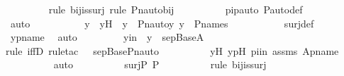 \begin{isabellebody}
\ \ \ \ \ \ \ \ \isamarkupfalse%
{\isacharparenleft}{\kern0pt}rule\ bij{\isacharunderscore}{\kern0pt}is{\isacharunderscore}{\kern0pt}surj{\isacharcomma}{\kern0pt}\ rule\ Pn{\isacharunderscore}{\kern0pt}auto{\isacharunderscore}{\kern0pt}bij{\isacharparenright}{\kern0pt}\isanewline
\ \ \ \ \ \ \ \ \isamarkupfalse%
\ pipauto\ P{\isacharunderscore}{\kern0pt}auto{\isacharunderscore}{\kern0pt}def\isanewline
\ \ \ \ \ \ \ \ \isamarkupfalse%
\ auto\ \isanewline
\ \ \ \ \ \ \isamarkupfalse%
\ \isamarkupfalse%
\ y{\isacharprime}{\kern0pt}\ \ y{\isacharprime}{\kern0pt}H\ {\isacharcolon}{\kern0pt}\ {\isachardoublequoteopen}y\ {\isacharequal}{\kern0pt}\ Pn{\isacharunderscore}{\kern0pt}auto{\isacharparenleft}{\kern0pt}{\isasympi}{\isacharparenright}{\kern0pt}{\isacharbackquote}{\kern0pt}y{\isacharprime}{\kern0pt}{\isachardoublequoteclose}\ {\isachardoublequoteopen}y{\isacharprime}{\kern0pt}\ {\isasymin}\ P{\isacharunderscore}{\kern0pt}names{\isachardoublequoteclose}\ \isanewline
\ \ \ \ \ \ \ \ \isamarkupfalse%
\ surj{\isacharunderscore}{\kern0pt}def\ \isamarkupfalse%
\ ypname\ \isamarkupfalse%
\ auto\ \isanewline
\ \ \ \ \ \ \isamarkupfalse%
\ y{\isacharprime}{\kern0pt}in\ {\isacharcolon}{\kern0pt}\ {\isachardoublequoteopen}y{\isacharprime}{\kern0pt}\ {\isasymin}\ sep{\isacharunderscore}{\kern0pt}Base{\isacharparenleft}{\kern0pt}A{\isacharparenright}{\kern0pt}{\isachardoublequoteclose}\ \isanewline
\ \ \ \ \ \ \ \ \isamarkupfalse%
{\isacharparenleft}{\kern0pt}rule\ iffD{}{\isacharcomma}{\kern0pt}\ rule{\isacharunderscore}{\kern0pt}tac\ {\isasympi}{\isacharequal}{\kern0pt}{\isasympi}\ \ sep{\isacharunderscore}{\kern0pt}Base{\isacharunderscore}{\kern0pt}Pn{\isacharunderscore}{\kern0pt}auto{\isacharparenright}{\kern0pt}\isanewline
\ \ \ \ \ \ \ \ \isamarkupfalse%
\ y{\isacharprime}{\kern0pt}H\ ypH\ piin\ assms\ Apname\isanewline
\ \ \ \ \ \ \ \ \isamarkupfalse%
\ auto\isanewline
\isanewline
\ \ \ \ \ \ \isamarkupfalse%
\ {\isachardoublequoteopen}{\isasympi}\ {\isasymin}\ surj{\isacharparenleft}{\kern0pt}P{\isacharcomma}{\kern0pt}\ P{\isacharparenright}{\kern0pt}{\isachardoublequoteclose}\ \isanewline
\ \ \ \ \ \ \ \ \isamarkupfalse%
{\isacharparenleft}{\kern0pt}rule\ bij{\isacharunderscore}{\kern0pt}is{\isacharunderscore}{\kern0pt}surj{\isacharparenright}{\kern0pt}\isanewline
\ \ \ \ \ \ \ \ \isamarkupfalse%

\end{isabellebody}
